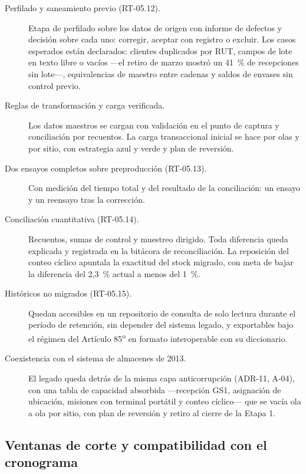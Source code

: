 \begin{description}

\item[Perfilado y saneamiento previo (RT-05.12).] Etapa de perfilado sobre los
datos de origen con informe de defectos y decisión sobre cada uno: corregir,
aceptar con registro o excluir.  Los casos esperados están declarados: clientes
duplicados por RUT, campos de lote en texto libre o vacíos ---el retiro de
marzo mostró un 41~\% de recepciones sin lote---, equivalencias de maestro
entre cadenas y saldos de envases sin control previo.

\item[Reglas de transformación y carga verificada.] Los datos maestros se
cargan con validación en el punto de captura y conciliación por recuentos.  La
carga transaccional inicial se hace por olas y por sitio, con estrategia azul y
verde y plan de reversión.

\item[Dos ensayos completos sobre preproducción (RT-05.13).] Con medición del
tiempo total y del resultado de la conciliación: un ensayo y un reensayo tras
la corrección.

\item[Conciliación cuantitativa (RT-05.14).] Recuentos, sumas de control y
muestreo dirigido.  Toda diferencia queda explicada y registrada en la bitácora
de reconciliación.  La reposición del conteo cíclico apuntala la exactitud del
stock migrado, con meta de bajar la diferencia del 2,3~\% actual a menos del
1~\%.

\item[Históricos no migrados (RT-05.15).] Quedan accesibles en un repositorio
de consulta de solo lectura durante el período de retención, sin depender del
sistema legado, y exportables bajo el régimen del Artículo 85\textsuperscript{o}
en formato interoperable con su diccionario.

\item[Coexistencia con el sistema de almacenes de 2013.] El legado queda detrás
de la misma capa anticorrupción (ADR-11, A-04), con una tabla de capacidad
absorbida ---recepción GS1, asignación de ubicación, misiones con terminal
portátil y conteo cíclico--- que se vacía ola a ola por sitio, con plan de
reversión y retiro al cierre de la Etapa 1.

\end{description}

\subsection{Ventanas de corte y compatibilidad con el cronograma}
\label{sec:migracion-ventanas}

